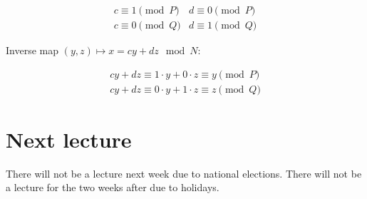 \documentclass{idc_msc}
\begin{document}
\[
  \begin{matrix}
  c \equiv 1 \pmod P & d \equiv 0 \pmod P \\
  c \equiv 0 \pmod Q & d \equiv 1 \pmod Q
  \end{matrix}
\]

Inverse map \((y, z) \mapsto x = cy + dz \mod N\):

\[
\begin{aligned}
  cy + dz \equiv 1 \cdot y + 0 \cdot z \equiv y \pmod P \\
  cy + dz \equiv 0 \cdot y + 1 \cdot z \equiv z \pmod Q
\end{aligned}
\]

\section{Next lecture}

There will not be a lecture next week due to national elections.
There will not be a lecture for the two weeks after due to holidays.
\end{document}

